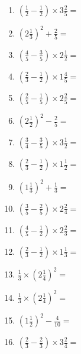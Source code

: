 \documentclass[12pt]{article}
\begin{document}
\begin{enumerate}
\item \large $ \left( \frac{1}{2} - \frac{1}{2} \right) \times 3 \frac{2}{5} = $ \vspace{1.6cm}
\item \large $ \left( 2 \frac{1}{3} \right)^2 + \frac{2}{5} = $ \vspace{1.6cm}
\item \large $ \left( \frac{4}{5} - \frac{3}{5} \right) \times 2 \frac{1}{2} = $ \vspace{1.6cm}
\item \large $ \left( \frac{2}{3} - \frac{1}{2} \right) \times 1 \frac{4}{5} = $ \vspace{1.6cm}
\item \large $ \left( \frac{2}{5} - \frac{1}{5} \right) \times 2 \frac{2}{5} = $ \vspace{1.6cm}
\newpage
\item \large $ \left( 2 \frac{1}{2} \right)^2 - \frac{2}{5} = $ \vspace{1.6cm}
\item \large $ \left( \frac{3}{4} - \frac{3}{5} \right) \times 3 \frac{1}{2} = $ \vspace{1.6cm}
\item \large $ \left( \frac{2}{3} - \frac{1}{2} \right) \times 1 \frac{1}{2} = $ \vspace{1.6cm}
\item \large $ \left( 1 \frac{1}{3} \right)^2 + \frac{1}{3} = $ \vspace{1.6cm}
\item \large $ \left( \frac{3}{5} - \frac{2}{5} \right) \times 2 \frac{2}{4} = $ \vspace{1.6cm}
\item \large $ \left( \frac{4}{5} - \frac{1}{2} \right) \times 2 \frac{2}{3} = $ \vspace{1.6cm}
\item \large $ \left( \frac{2}{3} - \frac{1}{2} \right) \times 1 \frac{1}{3} = $ \vspace{1.6cm}
\item \large $ \frac{1}{3} \times \left( 2 \frac{1}{4} \right)^2 = $ \vspace{1.6cm}
\item \large $ \frac{1}{3} \times \left( 2 \frac{1}{4} \right)^2 = $ \vspace{1.6cm}
\item \large $ \left( 1 \frac{1}{2} \right)^2 - \frac{4}{10} = $ \vspace{1.6cm}
\newpage
\item \large $ \left( \frac{2}{3} - \frac{2}{3} \right) \times 3 \frac{2}{4} = $ \vspace{1.6cm}

\end{enumerate}
\end{document}
